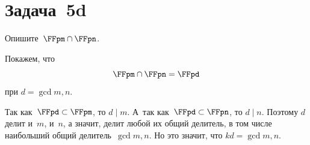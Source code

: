 \section{Задача~5d}

Опишите~$\FFpm \cap \FFpn$.

\begin{solution}
	Покажем, что
	\[
		\FFpm \cap \FFpn = \FFpd
	\]
	при $d = \gcd{m, n}$.

	Так как~$\FFpd \subset \FFpm$, то $d \mid m$. А~так как~$\FFpd \subset \FFpn$, то $d \mid n$. Поэтому $d$ делит и~$m$, и~$n$, а значит, делит любой их общий делитель, в том числе наибольший общий делитель~$\gcd{m, n}$. Но это значит, что $kd = \gcd{m, n}$.
\end{solution}
